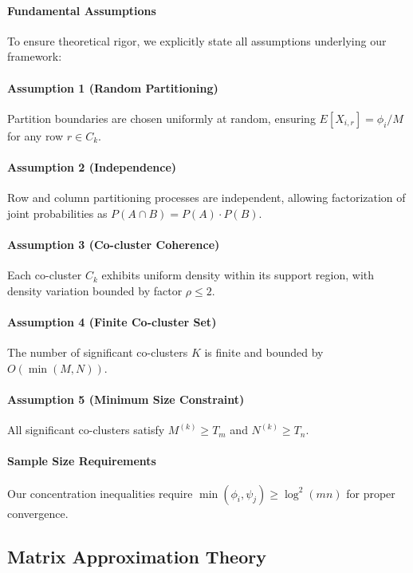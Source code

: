 \documentclass[journal]{IEEEtran}
\begin{document}
\paragraph{Fundamental Assumptions} To ensure theoretical rigor, we explicitly state all assumptions underlying our framework:

\paragraph{Assumption 1 (Random Partitioning)} Partition boundaries are chosen uniformly at random, ensuring $E[X_{i,r}] = \phi_i/M$ for any row $r \in C_k$.

\paragraph{Assumption 2 (Independence)} Row and column partitioning processes are independent, allowing factorization of joint probabilities as $P(A \cap B) = P(A) \cdot P(B)$.

\paragraph{Assumption 3 (Co-cluster Coherence)} Each co-cluster $C_k$ exhibits uniform density within its support region, with density variation bounded by factor $\rho \leq 2$.

\paragraph{Assumption 4 (Finite Co-cluster Set)} The number of significant co-clusters $K$ is finite and bounded by $O(\min(M,N))$.

\paragraph{Assumption 5 (Minimum Size Constraint)} All significant co-clusters satisfy $M^{(k)} \geq T_m$ and $N^{(k)} \geq T_n$.

\paragraph{Sample Size Requirements} Our concentration inequalities require $\min(\phi_i, \psi_j) \geq \log^2(mn)$ for proper convergence.

\subsection{Matrix Approximation Theory}
\end{document}
